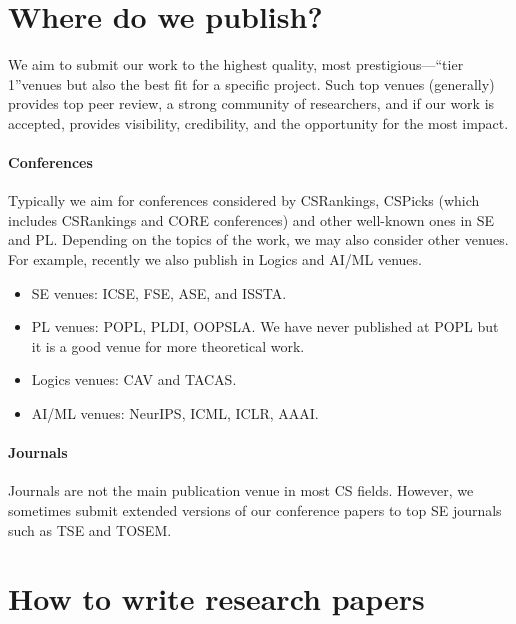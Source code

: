 \documentclass[oneside,11pt]{book}
\begin{document}
\section{Where do we publish?}

We aim to submit our work to the highest quality, most prestigious---``tier 1''venues but also the best fit for a specific project. 
Such top venues (generally) provides top peer review, a strong community of researchers, and if our work is accepted, provides visibility, credibility, and the opportunity for the most impact. 

\paragraph{Conferences}
Typically we aim for conferences considered by CSRankings, CSPicks (which includes CSRankings and CORE conferences) and other well-known ones in SE and PL. Depending on the topics of the work, we may also consider other venues.  For example, recently we also publish in Logics and AI/ML venues.

\begin{itemize}
\item SE venues: ICSE, FSE, ASE, and ISSTA. 
\item PL venues: POPL, PLDI, OOPSLA.  We have never published at POPL but it is a good venue for more theoretical work.
\item Logics venues: CAV and TACAS.
\item AI/ML venues: NeurIPS, ICML, ICLR, AAAI.
\end{itemize}

\paragraph{Journals}
Journals are not the main publication venue in most CS fields. However, we sometimes submit extended versions of our conference papers to top SE journals such as TSE and TOSEM.

\section{How to write research papers}
\end{document}
